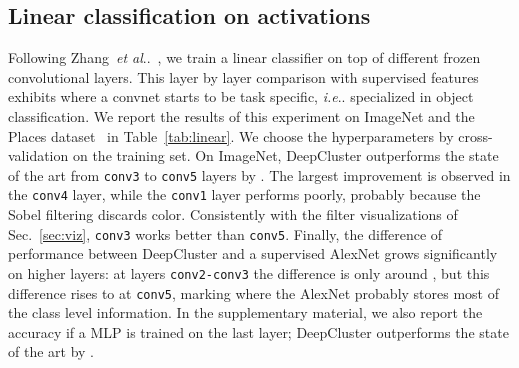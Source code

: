 \documentclass[runningheads]{llncs}
\makeatletter
\DeclareRobustCommand\onedot{\futurelet\@let@token\@onedot}
\def\@onedot{\ifx\@let@token.\else.\null\fi\xspace}
\def\ie{\emph{i.e}\onedot} \def\Ie{\emph{I.e}\onedot}
\def\etal{\emph{et al}\onedot}
\def\OURS{DeepCluster\xspace}
\makeatother
\begin{document}
\subsection{Linear classification on activations}
\label{sec:linear}

Following Zhang~\etal~\cite{zhang2016split}, we train a linear classifier on top of different frozen convolutional layers.
This layer by layer comparison with supervised features exhibits where a convnet starts to be task specific, \ie specialized in object classification.
We report the results of this experiment on ImageNet and the Places dataset~\cite{zhou2014learning} in Table~\ref{tab:linear}.
We choose the hyperparameters by cross-validation on the training set.
On ImageNet, \OURS outperforms the state of the art from \texttt{conv3} to \texttt{conv5} layers by .
The largest improvement is observed in the \texttt{conv4} layer, while the \texttt{conv1} layer performs poorly,
probably because the Sobel filtering discards color.
Consistently with the filter visualizations of Sec.~\ref{sec:viz}, \texttt{conv3} works better than \texttt{conv5}.
Finally, the difference of performance between \OURS and a supervised AlexNet grows significantly on higher layers:
at layers \texttt{conv2-conv3} the difference is only around , but this difference rises to  at \texttt{conv5}, marking where the AlexNet probably stores most of the class level information.
In the supplementary material, we also report the accuracy if a MLP is trained on the last layer; \OURS outperforms the state of the art by .
\end{document}
